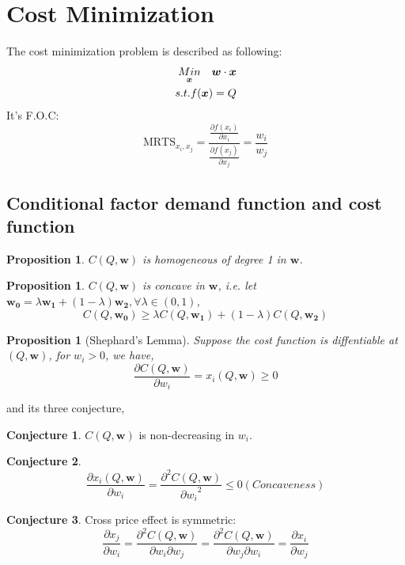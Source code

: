 \documentclass{book}
\theoremstyle{plain}
\newtheorem{prop}[thm]{Proposition}
\theoremstyle{definition}
\newtheorem{conj}{Conjecture}[section]
\theoremstyle{remark}
\begin{document}
\section{Cost Minimization\protect \footnotemark}
The cost minimization problem is described as following:
\begin{align}\notag
\underset{\bm{x}}{Min} \quad \bm{w}\cdot \bm{x} \\ \notag
s.t. f(\bm{x}) = Q
\end{align}
It's F.O.C:
\begin{equation}
	\text{MRTS}_{x_i,x_j}=\frac{\frac{\partial f(x_i)}{\partial x_i}}{\frac{\partial f(x_j)}{\partial x_j}} = \frac{w_i}{w_j}
\end{equation}
\subsection{Conditional factor demand function and cost function}
\begin{prop}
$C(Q,\bm{w})$ is homogeneous of degree 1 in $\bm{w}$.
\end{prop}

\begin{prop}
$C(Q,\bm{w})$ is concave in $\bm{w}$, i.e. let $\bm{w_0} = \lambda \bm{w_1} + (1-\lambda)\bm{w_2}, \forall \lambda \in (0,1)$, 
\begin{equation}
	C(Q,\bm{w_0}) \geq \lambda C(Q,\bm{w_1}) + (1-\lambda)C(Q,\bm{w_2})
\end{equation}
\end{prop}

\begin{prop}[Shephard's Lemma]
Suppose the cost function is diffentiable at $(Q,\bm{w})$, for $w_i>0$, we have,
\begin{equation}
	\frac{\partial C(Q,\bm{w})}{\partial w_i} = x_i(Q,\bm{w})\geq 0
\end{equation}
\end{prop}
and its three conjecture,
\begin{conj}
$C(Q,\bm{w})$ is non-decreasing in $w_i$.
\end{conj}
\begin{conj}
\begin{equation}
	\frac{\partial x_i(Q,\bm{w})}{\partial w_i} = \frac{\partial^2 C(Q,\bm{w})}{{\partial w_i}^2}\leq 0 (Concaveness)
\end{equation}
\end{conj}
\begin{conj}
Cross price effect is symmetric: 
\begin{equation}
\frac{\partial x_j}{\partial w_i} = \frac{\partial^2 C(Q, \bm{w})} {\partial {w_i} \partial {w_j}}=\frac{\partial^2 C(Q, \bm{w})} {\partial w_j \partial w_i} = \frac{\partial {x_i}}{\partial {w_j}}
\end{equation}
\end{conj}
\end{document}
